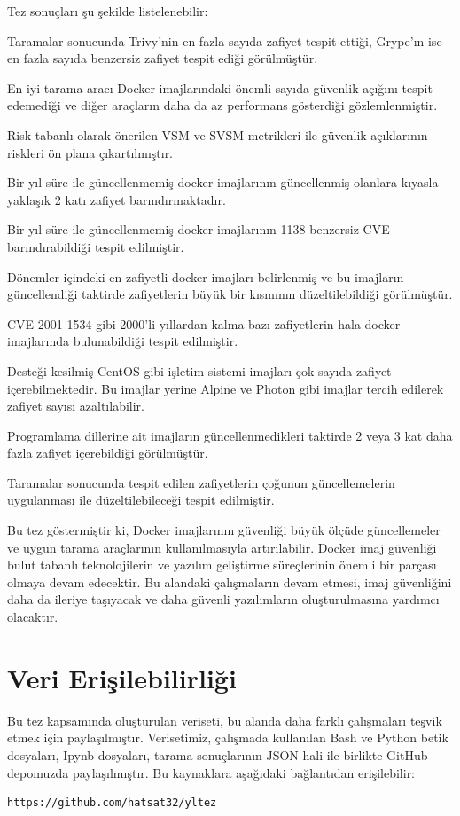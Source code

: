 Tez sonuçları şu şekilde listelenebilir:

\begin{maddelendir}[label=$\bullet$]
    \item Taramalar sonucunda Trivy'nin en fazla sayıda zafiyet tespit ettiği, Grype'ın ise en fazla sayıda benzersiz zafiyet tespit ediği görülmüştür.
    \item En iyi tarama aracı Docker imajlarındaki önemli sayıda güvenlik açığını tespit edemediği ve diğer araçların daha da az performans gösterdiği gözlemlenmiştir.
    \item Risk tabanlı olarak önerilen VSM ve SVSM metrikleri ile güvenlik açıklarının riskleri ön plana çıkartılmıştır.
    \item Bir yıl süre ile güncellenmemiş docker imajlarının güncellenmiş olanlara kıyasla yaklaşık 2 katı zafiyet barındırmaktadır.
    \item Bir yıl süre ile güncellenmemiş docker imajlarının 1138 benzersiz CVE barındırabildiği tespit edilmiştir.
    \item Dönemler içindeki en zafiyetli docker imajları belirlenmiş ve bu imajların güncellendiği taktirde zafiyetlerin büyük bir kısmının düzeltilebildiği görülmüştür.
    \item CVE-2001-1534 gibi 2000'li yıllardan kalma bazı zafiyetlerin hala docker imajlarında bulunabildiği tespit edilmiştir.
    \item Desteği kesilmiş CentOS gibi işletim sistemi imajları çok sayıda zafiyet içerebilmektedir. Bu imajlar yerine Alpine ve Photon gibi imajlar tercih edilerek zafiyet sayısı azaltılabilir.
    \item Programlama dillerine ait imajların güncellenmedikleri taktirde 2 veya 3 kat daha fazla zafiyet içerebildiği görülmüştür.
    \item Taramalar sonucunda tespit edilen zafiyetlerin çoğunun güncellemelerin uygulanması ile düzeltilebileceği tespit edilmiştir.
\end{maddelendir}

Bu tez göstermiştir ki, Docker imajlarının güvenliği büyük ölçüde güncellemeler ve uygun tarama araçlarının kullanılmasıyla artırılabilir. Docker imaj güvenliği bulut tabanlı teknolojilerin ve yazılım geliştirme süreçlerinin önemli bir parçası olmaya devam edecektir. Bu alandaki çalışmaların devam etmesi, imaj güvenliğini daha da ileriye taşıyacak ve daha güvenli yazılımların oluşturulmasına yardımcı olacaktır.

\chapter{Veri Erişilebilirliği}\label{sec:data-availability}

Bu tez kapsamında oluşturulan veriseti, bu alanda daha farklı çalışmaları teşvik etmek için paylaşılmıştır. Verisetimiz, çalışmada kullanılan Bash ve Python betik dosyaları, Ipynb dosyaları, tarama sonuçlarının JSON hali ile birlikte GitHub depomuzda paylaşılmıştır. Bu kaynaklara aşağıdaki bağlantıdan erişilebilir:

\begin{lstlisting}
https://github.com/hatsat32/yltez
\end{lstlisting}
